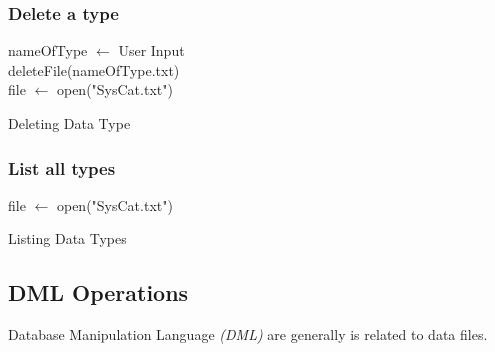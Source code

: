 \documentclass[12pt,a4paper]{article}
\begin{document}
        \subsubsection{Delete a type}
        \IncMargin{1em}
            \begin{algorithm}[H]
                \SetAlgoLined
                 nameOfType $\leftarrow$ User Input \\
                 deleteFile(nameOfType.txt) \\
                 file $\leftarrow$ open("SysCat.txt") \\
                 \caption{Deleting Data Type}
            \end{algorithm}
        \DecMargin{1em}
        \subsubsection{List all types}
            \IncMargin{1em}
                \begin{algorithm}[H]
                    \SetAlgoLined
                     file $\leftarrow$ open("SysCat.txt") \\
                     \caption{Listing Data Types}
                \end{algorithm}
            \DecMargin{1em}

    \subsection{DML Operations}
     Database Manipulation Language \emph{(DML)} are generally is related to data files.
\end{document}

